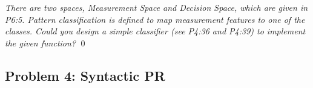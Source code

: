 \documentclass[
        ]{beamer}
\begin{document}
    		\begin{frame}[t]{\subsecname}
    			\begin{overprint}
    				\emph{There are two spaces, Measurement Space and Decision Space, which are given in P6:5. Pattern classification is defined to map measurement features to one of the classes. Could you design a simple classifier (see P4:36 and P4:39) to implement the given function? }
    				\onslide<2>  %
    				\onslide<3>  %
    				\onslide<4>  %
							\qed		
    			\end{overprint}
    		\end{frame}

    \subsection{Problem 4: Syntactic PR}
    
\end{document}

